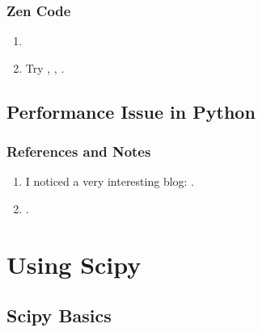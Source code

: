 \documentclass[letterpaper,12pt,english]{sphinxmanual}
\begin{document}
\subsection{Zen Code}
\label{\detokenize{python/python-basics:zen-code}}\begin{enumerate}
\item {} 

\item {} 
Try , , .

\end{enumerate}


\section{Performance Issue in Python}
\label{\detokenize{python/performance::doc}}\label{\detokenize{python/performance:performance-issue-in-python}}

\subsection{References and Notes}
\label{\detokenize{python/performance:references-and-notes}}\begin{enumerate}
\item {} 
I noticed a very interesting blog: .

\item {} 
.

\end{enumerate}


\chapter{Using Scipy}
\label{\detokenize{scipy/index::doc}}\label{\detokenize{scipy/index:using-scipy}}

\section{Scipy Basics}
\label{\detokenize{scipy/scipy-basics::doc}}\label{\detokenize{scipy/scipy-basics:scipy-basics}}
\end{document}
